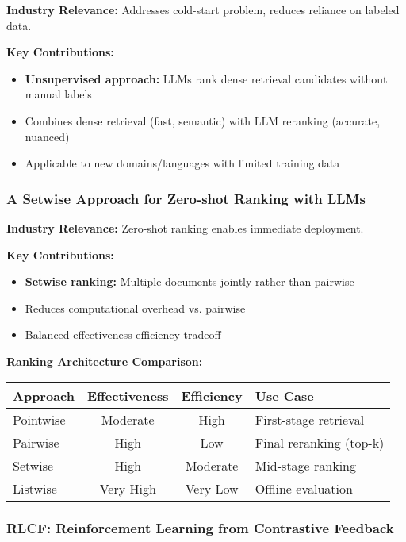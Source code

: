 \documentclass[11pt,letterpaper]{article}
\begin{document}
\textbf{Industry Relevance:} Addresses cold-start problem, reduces reliance on labeled data.

\textbf{Key Contributions:}
\begin{itemize}[leftmargin=*]
    \item \textbf{Unsupervised approach:} LLMs rank dense retrieval candidates without manual labels
    \item Combines dense retrieval (fast, semantic) with LLM reranking (accurate, nuanced)
    \item Applicable to new domains/languages with limited training data
\end{itemize}

\subsubsection{A Setwise Approach for Zero-shot Ranking with LLMs}

\textbf{Industry Relevance:} Zero-shot ranking enables immediate deployment.

\textbf{Key Contributions:}
\begin{itemize}[leftmargin=*]
    \item \textbf{Setwise ranking:} Multiple documents jointly rather than pairwise
    \item Reduces computational overhead vs. pairwise
    \item Balanced effectiveness-efficiency tradeoff
\end{itemize}

\textbf{Ranking Architecture Comparison:}
\begin{center}
\begin{tabular}{|l|c|c|l|}
\hline
\textbf{Approach} & \textbf{Effectiveness} & \textbf{Efficiency} & \textbf{Use Case} \\
\hline
Pointwise & Moderate & High & First-stage retrieval \\
Pairwise & High & Low & Final reranking (top-k) \\
Setwise & High & Moderate & Mid-stage ranking \\
Listwise & Very High & Very Low & Offline evaluation \\
\hline
\end{tabular}
\end{center}

\subsubsection{RLCF: Reinforcement Learning from Contrastive Feedback}
\end{document}
